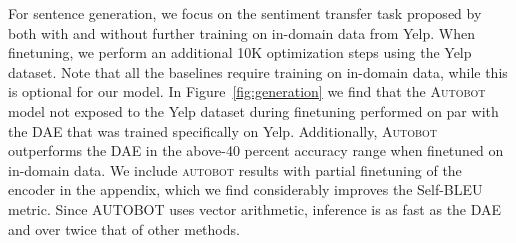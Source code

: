 
For sentence generation, we focus on the sentiment transfer task proposed by \citet{shen2019educating} both with and without further training on in-domain data from Yelp. When finetuning, we perform an additional 10K optimization steps using the Yelp dataset.  Note that all the baselines require training on in-domain data, while this is optional for our model.  In Figure~\ref{fig:generation}
we find that the \textsc{Autobot} model not exposed to the Yelp dataset during finetuning performed on par with the 
DAE that was trained specifically on Yelp. Additionally, \textsc{Autobot} outperforms the DAE in the above-40 percent accuracy range when finetuned on in-domain data.
We include \textsc{autobot} results with partial finetuning of the encoder in the appendix, which we find considerably improves the Self-BLEU metric.
Since \textsc{AUTOBOT} uses vector arithmetic, inference is as fast as the DAE and over twice that of other methods.



